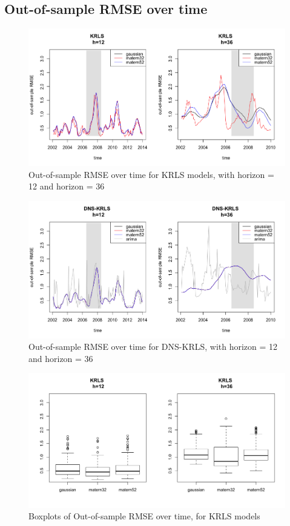 
\subsection{Out-of-sample RMSE over time}
\label{sec:graph_rmse}


\begin{figure}[!htb]
\centering
\includegraphics[width=12cm]{gfx/chapter-krls-models/krls_oos_rmse_1}
\caption{Out-of-sample RMSE over time for KRLS models, with horizon = 12 and horizon = 36}
\label{oos_rmse_krls}
\end{figure}

\begin{figure}[!htb]
\centering
\includegraphics[width=12cm]{gfx/chapter-krls-models/krls_oos_rmse_2}
\caption{Out-of-sample RMSE over time for DNS-KRLS, with horizon = 12 and horizon = 36}
\label{oos_rmse_dns_krls}
\end{figure}

\begin{figure}[!htb]
\centering
\includegraphics[width=12cm]{gfx/chapter-krls-models/oos_rmse_dns_krls_1}
\caption{Boxplots of Out-of-sample RMSE over time, for KRLS models}
\label{oos_rmse_dns_krls_1}
\end{figure}

